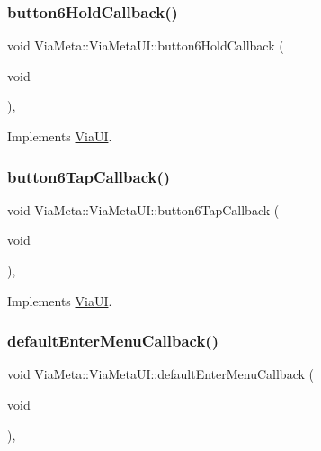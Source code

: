 \subsubsection{\texorpdfstring{button6\+Hold\+Callback()}{button6HoldCallback()}}
{\footnotesize\ttfamily void Via\+Meta\+::\+Via\+Meta\+U\+I\+::button6\+Hold\+Callback (\begin{DoxyParamCaption}\item[{void}]{ }\end{DoxyParamCaption})\hspace{0.3cm}{\ttfamily [override]}, {\ttfamily [virtual]}}



Implements \mbox{\hyperlink{class_via_u_i_afa66f7946b6cf755b94383715b26a651}{Via\+UI}}.

\mbox{\label{class_via_meta_1_1_via_meta_u_i_a8b8724e5d68649da49f3f99203257833}} 
\subsubsection{\texorpdfstring{button6\+Tap\+Callback()}{button6TapCallback()}}
{\footnotesize\ttfamily void Via\+Meta\+::\+Via\+Meta\+U\+I\+::button6\+Tap\+Callback (\begin{DoxyParamCaption}\item[{void}]{ }\end{DoxyParamCaption})\hspace{0.3cm}{\ttfamily [override]}, {\ttfamily [virtual]}}



Implements \mbox{\hyperlink{class_via_u_i_a8a6bf29d336faa8e9d026a84be45d956}{Via\+UI}}.

\mbox{\label{class_via_meta_1_1_via_meta_u_i_a632c291b811cf6e704e913060083dd7d}} 
\subsubsection{\texorpdfstring{default\+Enter\+Menu\+Callback()}{defaultEnterMenuCallback()}}
{\footnotesize\ttfamily void Via\+Meta\+::\+Via\+Meta\+U\+I\+::default\+Enter\+Menu\+Callback (\begin{DoxyParamCaption}\item[{void}]{ }\end{DoxyParamCaption})\hspace{0.3cm}{\ttfamily [override]}, {\ttfamily [virtual]}}



